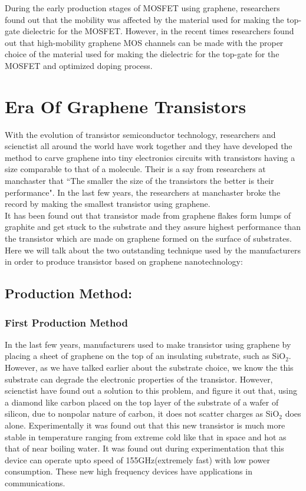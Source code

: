 \documentclass[conference]{IEEEtran}
\begin{document}
During the early production stages of MOSFET using graphene, researchers found out that the mobility was affected by the material used for making the top-gate dielectric for the MOSFET. However, in the recent times researchers found out that high-mobility graphene MOS channels can be made with the proper choice of the material used for making the dielectric for the top-gate for the MOSFET and optimized doping process.
\\

\section{\textbf{Era Of Graphene Transistors}}
With the evolution of transistor semiconductor technology, researchers and scienctist all around the world have work together and they have developed the method to carve graphene into tiny electronics circuits with transistors having a size comparable to that of a molecule. Their is a say from researchers at manchaster that ``The smaller the size of the transistors the better is their performance".
In the last few years, the researchers at manchaster broke the record by making the smallest transistor using graphene.
\\

It has been found out that transistor made from graphene flakes form lumps of graphite and get stuck to the substrate and they assure highest performance than the transistor which are made on graphene formed on the surface of substrates. Here we will talk about the two outstanding technique used by the manufacturers in order to produce transistor based on graphene nanotechnology:
\\

\subsection{\textbf{Production Method:}}
\subsubsection{\textbf{First Production Method}}
In the last few years, manufacturers used to make transistor using graphene by placing a sheet of graphene on the top of an insulating substrate, such as SiO$_2$. However, as we have talked earlier about the substrate choice, we know the this substrate can degrade the electronic properties of the transistor. However, scienctist have found out a solution to this problem, and figure it out that, using a diamond like carbon placed on the top layer of the substrate of a wafer of silicon, due to nonpolar nature of carbon, it does not scatter charges as SiO$_2$ does alone. Experimentally it was found out that this new transistor is much more stable in temperature ranging from extreme cold like that in space and hot as that of near boiling water. It was found out during experimentation that this device can operate upto speed of 155GHz(extremely fast) with low power consumption. These new high frequency devices have applications in communications.
\\
\end{document}
